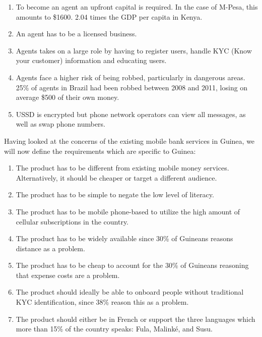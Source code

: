 \documentclass[11pt, a4paper]{article}
\begin{document}
\begin{enumerate}
  \item To become an agent an upfront capital is required. In the case of M-Pesa, this amounts to \$1600\cite{cgapreq}. 2.04 times the GDP per capita in Kenya\cite{cgapreq}.
  \item An agent has to be a licensed business\cite{cgapreq}.
  \item Agents takes on a large role by having to register users, handle KYC (Know your customer) information and educating users.
  \item Agents face a higher risk of being robbed, particularly in dangerous areas. 25\% of agents in Brazil had been robbed between 2008 and 2011, losing on average \$500 of their own money\cite{cgapreq}.
  \item USSD is encrypted but phone network operators can view all messages, as well as swap phone numbers.\\
\end{enumerate}

Having looked at the concerns of the existing mobile bank services in Guinea, we will now define the requirements which are specific to Guinea:

\begin{enumerate}
  \item The product has to be different from existing mobile money services. Alternatively, it should be cheaper or target a different audience.
  \item The product has to be simple to negate the low level of literacy.
  \item The product has to be mobile phone-based to utilize the high amount of cellular subscriptions in the country.
  \item The product has to be widely available since 30\% of Guineans reasons distance as a problem.
  \item The product has to be cheap to account for the 30\% of Guineans reasoning that expense costs are a problem.
  \item The product should ideally be able to onboard people without traditional KYC identification, since 38\% reason this as a problem.
  \item The product should either be in French or support the three languages which more than 15\% of the country speaks: Fula, Malinké, and Susu.
\end{enumerate}
\end{document}
